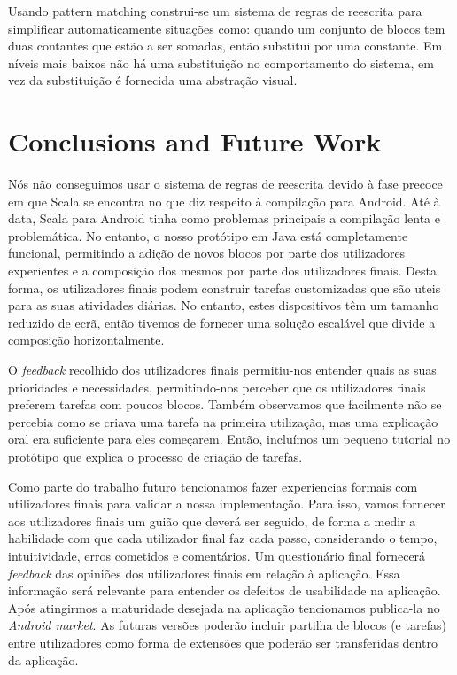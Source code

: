 \documentclass[9pt,a4paper]{extarticle}
\begin{document}
\begin{multicols}{2}
Usando pattern matching construi-se um sistema de regras de reescrita para simplificar automaticamente situações como: quando um conjunto de blocos tem duas contantes que estão a ser somadas, então substitui por uma constante. Em níveis mais baixos não há uma substituição no comportamento do sistema, em vez da substituição é fornecida uma abstração visual.

\section{Conclusions and Future Work}\label{sec:conclui}

Nós não conseguimos usar o sistema de regras de reescrita devido à fase precoce em que Scala se encontra no que diz respeito à compilação para Android. Até à data, Scala para Android tinha como problemas principais a compilação lenta e problemática. No entanto, o nosso protótipo em Java está completamente funcional, permitindo a adição de novos blocos por parte dos utilizadores experientes e a composição dos mesmos por parte dos utilizadores finais.
Desta forma, os utilizadores finais podem construir tarefas customizadas que são uteis para as suas atividades diárias. No entanto, estes dispositivos têm um tamanho reduzido de ecrã, então tivemos de fornecer uma solução escalável que divide a composição horizontalmente.

O \emph{feedback} recolhido dos utilizadores finais permitiu-nos entender quais as suas prioridades e necessidades, permitindo-nos perceber que os utilizadores finais preferem tarefas com poucos blocos. Também observamos que facilmente não se percebia como se criava uma tarefa na primeira utilização, mas uma explicação oral era suficiente para eles começarem. Então, incluímos um pequeno tutorial no protótipo que explica o processo de criação de tarefas.

Como parte do trabalho futuro tencionamos fazer experiencias formais com utilizadores finais para validar a nossa implementação. Para isso, vamos fornecer aos utilizadores finais um guião que deverá ser seguido, de forma a medir a habilidade com que cada utilizador final faz cada passo, considerando o tempo, intuitividade, erros cometidos e comentários. Um questionário final fornecerá \emph{feedback} das opiniões dos utilizadores finais em relação à aplicação. Essa informação será relevante para entender os defeitos de usabilidade na aplicação. Após atingirmos a maturidade desejada na aplicação tencionamos publica-la no \emph{Android market}. As futuras versões poderão incluir partilha de blocos (e tarefas) entre utilizadores como forma de extensões que poderão ser transferidas dentro da aplicação.




\end{multicols}
\end{document}
